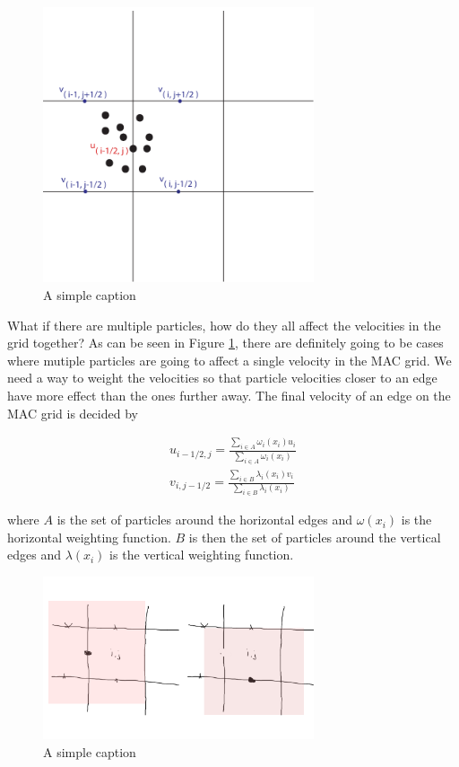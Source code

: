 \begin{figure}[ht!]
\centering
\includegraphics[width=80mm]{img/transfer2.pdf}
\caption{A simple caption}
\label{fouredge}
\end{figure}

What if there are multiple particles, how do they all affect the velocities in the grid together? As can be seen in Figure \ref{fouredge}, there are definitely going to be cases where mutiple particles are going to affect a single velocity in the MAC grid. We need a way to weight the velocities so that particle velocities closer to an edge have more effect than the ones further away. The final velocity of an edge on the MAC grid is decided by

\begin{eqnarray}
u_{i-1/2,j} = \frac{\sum\limits_{i\in A}\omega_i(x_i) u_{i}}{\sum\limits_{i \in A}\omega_i(x_i)} \\
v_{i,j-1/2} = \frac{ \sum\limits_{i \in B}\lambda_i(x_i) v_{i}}{\sum\limits_{i \in B}\lambda_i(x_i)}
\label{weightsums}
\end{eqnarray}

where $A$ is the set of particles around the horizontal edges and $\omega(x_i)$ is the horizontal weighting function. $B$ is then the set of particles around the vertical edges and $\lambda(x_i)$ is the vertical weighting function.

\begin{figure}[ht!]
\centering
\includegraphics[width=80mm]{ch3/areaA.png}
\caption{A simple caption}
\label{areaa}
\end{figure}

